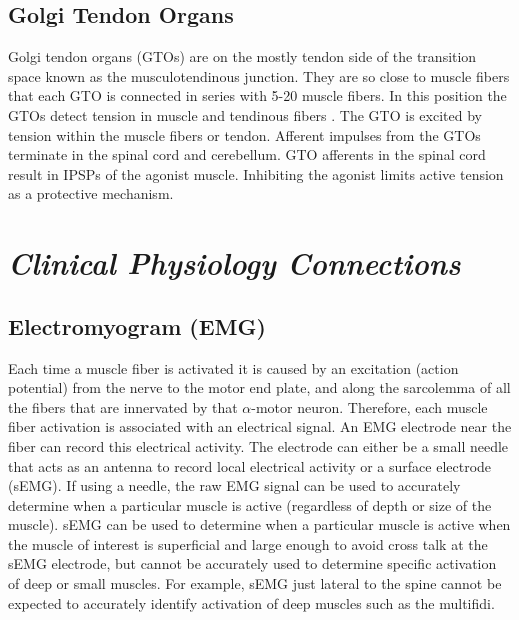 \subsection{Golgi Tendon Organs}

Golgi tendon organs (GTOs) are on the mostly tendon side of the transition space known as the musculotendinous junction. They are so close to muscle fibers that each GTO is connected in series with 5-20 muscle fibers. In this position the GTOs detect tension in muscle and tendinous fibers \cite{macefield_physiological_2005}. The GTO is excited by tension within the muscle fibers or tendon. Afferent impulses from the GTOs terminate in the spinal cord and cerebellum. GTO afferents in the spinal cord result in IPSPs of the agonist muscle. Inhibiting the agonist limits active tension as a protective mechanism.

\section{\textit{Clinical Physiology Connections}}

\subsection{Electromyogram (EMG)}

Each time a muscle fiber is activated it is caused by an excitation (action potential) from the nerve to the motor end plate, and along the sarcolemma of all the fibers that are innervated by that $\alpha$-motor neuron. Therefore, each muscle fiber activation is associated with an electrical signal. An EMG electrode near the fiber can record this electrical activity. The electrode can either be a small needle that acts as an antenna to record local electrical activity or a surface electrode (sEMG). If using a needle, the raw EMG signal can be used to accurately determine when a particular muscle is active (regardless of depth or size of the muscle). sEMG can be used to determine when a particular muscle is active when the muscle of interest is superficial and large enough to avoid cross talk at the sEMG electrode, but cannot be accurately used to determine specific activation of deep or small muscles. For example, sEMG just lateral to the spine cannot be expected to accurately identify activation of deep muscles such as the multifidi.

